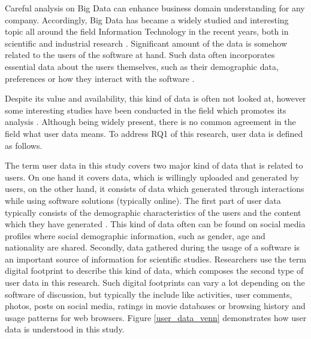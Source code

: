 Careful analysis on Big Data can enhance business domain understanding for any company. Accordingly, Big Data has became a widely studied and interesting topic all around the field Information Technology in the recent years, both in scientific and industrial research \cite{inmon2007tapping, introtodatamining}. Significant amount of the data is somehow related to the users of the software at hand. Such data often incorporates essential data about the users themselves, such as their demographic data, preferences or how they interact with the software 
\cite{jang2015noreciprocity, hu2014we, jang2016teensengagemorewithfewerphotos, han2016teensarefrommars, socialdiversityongithub}. 

Despite its value and availability, this kind of data is often not looked at, however some interesting studies have been conducted in the field which promotes its analysis \cite{jang2016teensengagemorewithfewerphotos}. Although being widely present, there is no common agreement in the field what user data means. To address RQ1 of this research, user data is defined as follows. 

The term user data in this study covers two major kind of data that is related to users. On one hand it covers data, which is willingly uploaded and generated by users, on the other hand, it consists of data which generated through interactions while using software solutions (typically online).
The first part of user data typically consists of the demographic characteristics of the users and the content which they have generated \cite{han2016teensarefrommars}. This kind of data often can be found on social media profiles where social demographic information, such as gender, age and nationality are shared.
Secondly, data gathered during the usage of a software is an important source of information for scientific studies. Researchers use the term digital footprint \cite{youyou2015computer} to describe this kind of data, which composes the second type of user data in this research. Such digital footprints can vary a lot depending on the software of discussion, but typically the include like activities, user comments, photos, posts on social media, ratings in movie databases or browsing history and usage patterns for web browsers. Figure \ref{user_data_venn} demonstrates how user data is understood in this study.


